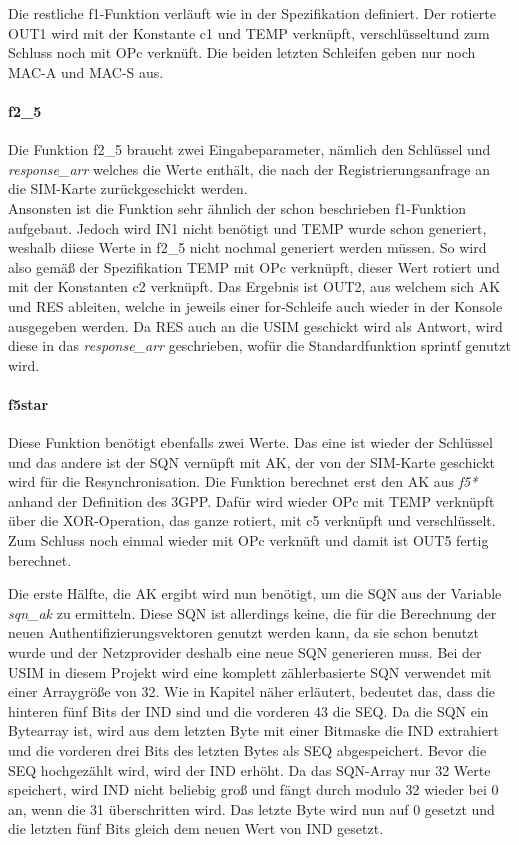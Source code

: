 		Die restliche f1-Funktion verläuft wie in der Spezifikation definiert. Der rotierte OUT1 wird mit der
		Konstante c1 und TEMP verknüpft, verschlüsseltund zum Schluss noch mit OPc verknüft. Die beiden letzten
		Schleifen geben nur noch MAC-A und MAC-S aus.		
		
		\paragraph{f2\_5}
		Die Funktion f2\_5 braucht zwei Eingabeparameter, nämlich den Schlüssel und \emph{response\_arr} welches
		die Werte enthält, die nach der Registrierungsanfrage an die SIM-Karte zurückgeschickt werden. \\
		Ansonsten ist die Funktion sehr ähnlich der schon beschrieben f1-Funktion aufgebaut. Jedoch wird IN1
		nicht benötigt und TEMP wurde schon generiert, weshalb diiese Werte in f2\_5 nicht nochmal generiert
		werden müssen. So wird also gemäß der Spezifikation TEMP mit OPc verknüpft, dieser Wert rotiert und mit
		der Konstanten c2 verknüpft. Das Ergebnis ist OUT2, aus welchem sich AK und RES ableiten, welche in jeweils
		einer for-Schleife auch wieder in der Konsole ausgegeben werden. Da RES auch an die USIM geschickt wird als
		Antwort, wird diese in das \emph{response\_arr} geschrieben, wofür die Standardfunktion sprintf genutzt wird.
		
		\paragraph{f5star}
		Diese Funktion benötigt ebenfalls zwei Werte. Das eine ist wieder der Schlüssel und das andere ist der SQN
		vernüpft mit AK, der von der SIM-Karte geschickt wird für die Resynchronisation. Die Funktion berechnet erst
		den AK aus \emph{f5*} anhand der Definition des 3GPP. Dafür wird wieder OPc mit TEMP verknüpft über die
		XOR-Operation, das ganze rotiert, mit c5 verknüpft und verschlüsselt. Zum Schluss noch einmal wieder mit
		OPc verknüft und damit ist OUT5 fertig berechnet.
		
		Die erste Hälfte, die AK ergibt wird nun benötigt, um die SQN aus der Variable \emph{sqn\_ak} zu ermitteln.
		Diese SQN ist allerdings keine, die für die Berechnung der neuen Authentifizierungsvektoren genutzt werden
		kann, da sie schon benutzt wurde und der Netzprovider deshalb eine neue SQN generieren muss. Bei der USIM
		in diesem Projekt wird eine komplett zählerbasierte SQN verwendet mit einer Arraygröße von 32.
		Wie in Kapitel  näher erläutert, bedeutet das, dass die hinteren fünf Bits der
		IND sind und die vorderen 43 die SEQ. Da die SQN ein Bytearray ist, wird aus dem letzten Byte mit einer
		Bitmaske die IND extrahiert und die vorderen drei Bits des letzten Bytes als SEQ abgespeichert. Bevor
		die SEQ hochgezählt wird, wird der IND erhöht. Da das SQN-Array nur 32 Werte speichert, wird IND nicht
		beliebig groß und fängt durch modulo 32 wieder bei 0 an, wenn die 31 überschritten wird. Das letzte Byte
		wird nun auf 0 gesetzt und die letzten fünf Bits gleich dem neuen Wert von IND gesetzt.

